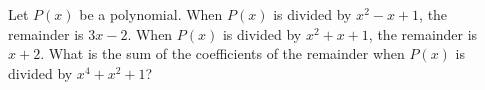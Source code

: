 Let $P(x)$ be a polynomial. When $P(x)$ is divided by $x^2-x+1$, the remainder is $3x-2$. When $P(x)$ is divided by $x^2+x+1$, the remainder is $x+2$. What is the sum of the coefficients of the remainder when $P(x)$ is divided by $x^4+x^2+1$?
